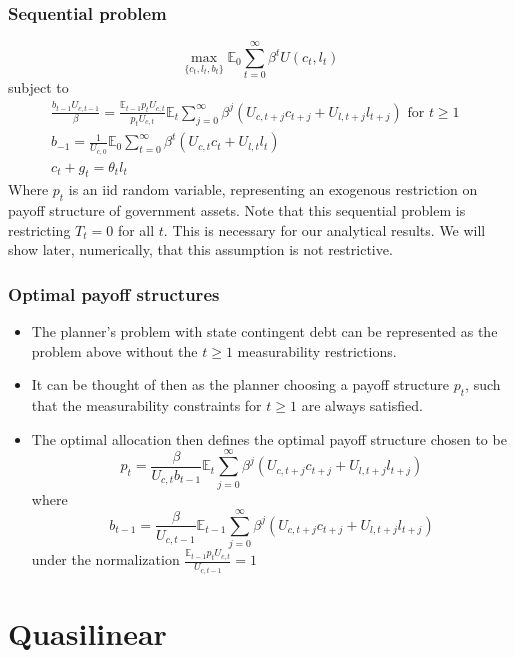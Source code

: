 \documentclass{beamer}
\newcommand{\EE}{\mathbb E}
\begin{document}
 \begin{frame}
 \frametitle{Sequential problem}  
\[
	\max_{\{c_t,l_t,b_t\}} \EE_0\sum_{t=0}^\infty \beta^t U(c_t,l_t)
\]subject to
\begin{align*}
	\frac{b_{t-1}U_{c,t-1}}{\beta} = \frac{\EE_{t-1} p_t U_{c,t}}{p_t U_{c,t}}\EE_t\sum_{j=0}^\infty\beta^j\left( U_{c,t+j}c_{t+j}+U_{l,t+j}l_{t+j}\right)\text{  for $t\geq 1$ }\\
	b_{-1} = \frac1{U_{c,0}}\EE_0\sum_{t=0}^\infty \beta^t\left(U_{c,t}c_t+U_{l,t}l_t\right)\\
	c_t + g_t = \theta_t l_t
\end{align*}
Where $p_t$ is an iid random variable, representing an exogenous restriction on payoff structure of government assets.  Note that this sequential problem is restricting $T_t = 0$ for all $t$.  This is necessary for our analytical results.  We will show later, numerically, that this assumption is not restrictive.
  \end{frame}
  
 \begin{frame}
\frametitle{Optimal payoff structures}
\begin{itemize}
\item The planner's problem with state contingent debt can be represented as the problem above without the $t\geq1$ measurability restrictions.
\item  It can be thought of then as the planner choosing a payoff structure $p_t$, such that the measurability constraints for $t\geq 1$ are always satisfied.
\item  The optimal allocation then defines the optimal payoff structure chosen to be
\[
	p_t = \frac{\beta}{U_{c,t}b_{t-1}}\EE_t\sum_{j=0}^\infty\beta^j\left(U_{c,t+j}c_{t+j}+U_{l,t+j}l_{t+j}\right)
\]where
\[
	b_{t-1} = \frac{\beta}{U_{c,t-1}}\EE_{t-1}\sum_{j=0}^\infty\beta^j\left(U_{c,t+j}c_{t+j}+U_{l,t+j}l_{t+j}\right)
\]under the normalization $\frac{\EE_{t-1} p_t U_{c,t}}{U_{c,t-1}} = 1$
\end{itemize}
\end{frame} 

\section{Quasilinear}
\subsection{}
 
\end{document}
